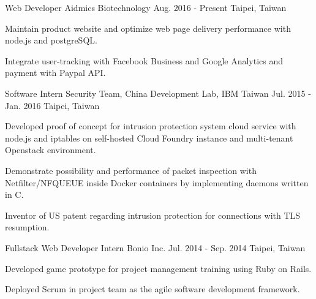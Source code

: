 

\begin{cventries}

  \cventry
    {Web Developer} %
    {Aidmics Biotechnology} %
    {Aug. 2016 - Present} %
    {Taipei, Taiwan} %
    {
      \begin{cvitems} %
        \item {Maintain product website and optimize web page delivery performance with node.js and postgreSQL.}
        \item {Integrate user-tracking with Facebook Business and Google Analytics and payment with Paypal API.}
      \end{cvitems}
    }
  \cventry
    {Software Intern} %
    {Security Team, China Development Lab, IBM Taiwan} %
    {Jul. 2015 - Jan. 2016} %
    {Taipei, Taiwan} %
    {
      \begin{cvitems} %
        \item {Developed proof of concept for intrusion protection system cloud service with node.js and iptables on self-hosted Cloud Foundry instance and multi-tenant Openstack environment.}
        \item {Demonstrate possibility and performance of packet inspection with Netfilter/NFQUEUE inside Docker containers by implementing daemons written in C.}
        \item {Inventor of US patent regarding intrusion protection for connections with TLS resumption.}
      \end{cvitems}
    }
  \cventry
    {Fullstack Web Developer Intern} %
    {Bonio Inc.} %
    {Jul. 2014 - Sep. 2014} %
    {Taipei, Taiwan} %
    {
      \begin{cvitems} %
        \item {Developed game prototype for project management training using Ruby on Rails.}
        \item {Deployed Scrum in project team as the agile software development framework.}
      \end{cvitems} 
    }
\end{cventries}
